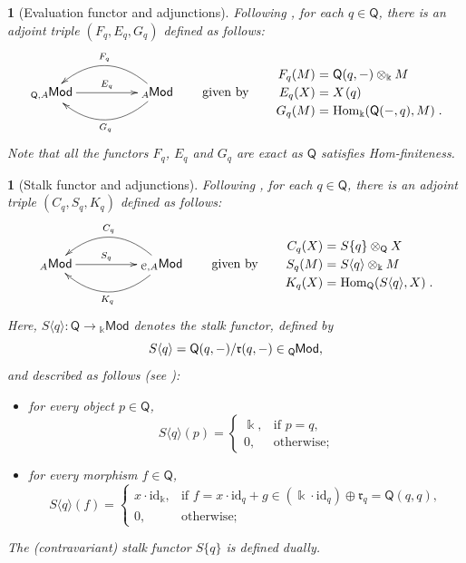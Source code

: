 \documentclass{amsart}
\theoremstyle{bfupright head,slanted body}
\theoremstyle{bfupright head,upright body}
\newtheorem{bfhpg}[res]{}               \newtheorem*{bfhpg*}{}
\theoremstyle{fixed bf head,slanted body}
\theoremstyle{fixed bf head,upright body}
\theoremstyle{numbered paragraph}
\numberwithin{equation}{res}
\newcommand{\Mod}[1]{{_{#1}\mathsf{Mod}}}
\newcommand{\Hom}{\operatorname{Hom}}
\newcommand{\C}{\mathcal{C}}
\newcommand{\Q}{\mathsf{Q}}
\newcommand{\id}{\mathrm{id}}
\newcommand{\kk}{\Bbbk}
\newcommand{\lMod}[1]{{}_{#1}\mspace{-1mu}{\sf{Mod}}}
\begin{document}
\begin{bfhpg}[Evaluation functor and adjunctions]\label{eva}
Following \cite[Corollary 3.9]{HJ22}, for each $q \in \Q$, there is an adjoint triple $(F_{q},E_{q},G_{q})$ defined as follows:
  \begin{equation*}
  \xymatrix@C=4pc{
      \lMod{\Q,A}
    \ar[r]^-{E_{q}}
    & \lMod{A}
    \ar@/_1.8pc/[l]_-{F_{q}}
    \ar@/^1.8pc/[l]^-{G_{q}}
  }
  \qquad \text{given by} \qquad
  {\setlength\arraycolsep{1.5pt}
   \renewcommand{\arraystretch}{1.2}
  \begin{array}{rcl}
  F_q(M) &=& \Q(q,-) \otimes_\kk M \\
  E_q(X) &=& X\mspace{1.5mu}(q) \\
  G_{q}(M) &=& \Hom_{\kk}(\Q(-,q),M)\;.
  \end{array}
  }
  \end{equation*}
Note that all the functors $F_q$, $E_q$ and $G_q$ are exact as $\Q$ satisfies Hom-finiteness.
\end{bfhpg}

\begin{bfhpg}[Stalk functor and adjunctions]\label{stalk}
Following \cite[Proposition 7.15]{HJ22}, for each $q\in\Q$, there is an adjoint triple $(C_{q},S_{q},K_{q})$ defined as follows:
  \begin{equation*}
  \xymatrix@C=4pc{
    \Mod{A}
    \ar[r]^-{S_{q}}
    &
    \Mod{\C,A}
    \ar@/_1.8pc/[l]_-{C_{q}}
    \ar@/^1.8pc/[l]^-{K_{q}}
  }
  \qquad \text{given by} \qquad
  {\setlength\arraycolsep{1.5pt}
   \renewcommand{\arraystretch}{1.2}
  \begin{array}{rcl}
  C_q(X) &=& S\{q\} \otimes_\Q X \\
  S_q(M) &=& S\langle q\rangle\otimes_\kk M \\
  K_{q}(X) &=& \Hom_\Q(S\langle q\rangle,X)\;.
  \end{array}
  }
  \end{equation*}
Here, $S\langle q\rangle: \Q\to \Mod{\kk}$ denotes the \emph{stalk functor}, defined by
$$S\langle q\rangle=\Q(q,-)/\mathfrak{r}(q,-)\in\lMod{\Q},$$
and described as follows (see \cite[Lemma 7.10]{HJ22}):
\begin{itemize}
\item for every object $p\in\Q$,
$$S\langle q\rangle(p)=
\begin{cases}
\kk, & \text{if } p=q,\\
0, & \text{otherwise};
\end{cases}$$
\item for every morphism $f\in\Q$,
$$S\langle q\rangle(f) =
\begin{cases}
x\cdot \id_\kk, & \text{if } f=x\cdot\id_q+g\in(\kk\cdot\id_q)\oplus\mathfrak r_q=\Q(q,q),\\
0, & \text{otherwise};
\end{cases}$$
\end{itemize}
The (contravariant) stalk functor $S\{q\}$ is defined dually.
\end{bfhpg}
\end{document}

